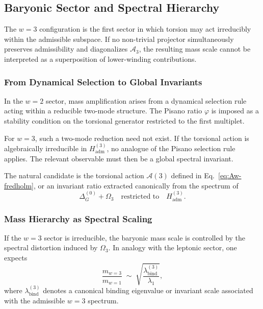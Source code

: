 \subsection{Baryonic Sector and Spectral Hierarchy}
  \label{sec:baryonic-sector}

  The $w=3$ configuration is the first sector in which torsion may act
  irreducibly within the admissible subspace.
  If no non-trivial projector simultaneously preserves admissibility and
  diagonalizes $\mathcal{A}_3$, the resulting mass scale cannot be
  interpreted as a superposition of lower-winding contributions.

  \subsubsection*{From Dynamical Selection to Global Invariants}

    In the $w=2$ sector, mass amplification arises from a dynamical
    selection rule acting within a reducible two-mode structure.
    The Pisano ratio $\varphi$ is imposed as a stability condition on the
    torsional generator restricted to the first multiplet.

    For $w=3$, such a two-mode reduction need not exist.
    If the torsional action is algebraically irreducible in
    $H_{\mathrm{adm}}^{(3)}$, no analogue of the Pisano selection rule
    applies.
    The relevant observable must then be a global spectral invariant.

    The natural candidate is the torsional action
    \(
    \mathcal{A}(3)
    \)
    defined in Eq.~\eqref{eq:Aw-fredholm},
    or an invariant ratio extracted canonically from the spectrum of
    \begin{equation}
      \Delta^{(0)}_G+\Omega_3
      \quad\text{restricted to}\quad
      H_{\mathrm{adm}}^{(3)}.
    \end{equation}

  \subsubsection*{Mass Hierarchy as Spectral Scaling}

    If the $w=3$ sector is irreducible,
    the baryonic mass scale is controlled by the spectral distortion
    induced by $\Omega_3$.
    In analogy with the leptonic sector, one expects
    \begin{equation}
      \frac{m_{w=3}}{m_{w=1}}
      \;\sim\;
      \sqrt{
        \frac{\lambda_{\mathrm{bind}}^{(3)}}
        {\lambda_{1}}
      },
    \end{equation}
    where $\lambda_{\mathrm{bind}}^{(3)}$ denotes a canonical binding
    eigenvalue or invariant scale associated with the admissible
    $w=3$ spectrum.


